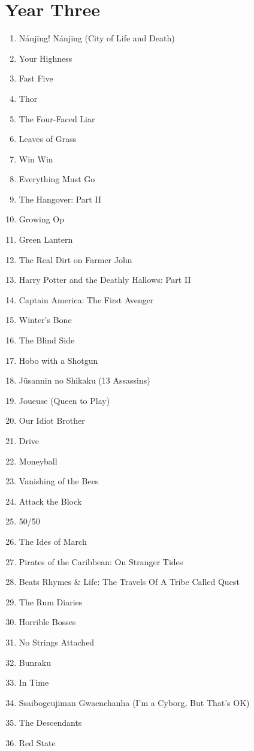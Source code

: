 \documentclass[11pt]{article}
\begin{document}
\section{Year Three}
\begin{enumerate}
\item Nánjīng! Nánjīng (City of Life and Death)
\item Your Highness
\item Fast Five
\item Thor
\item The Four-Faced Liar
\item Leaves of Grass
\item Win Win
\item Everything Must Go
\item The Hangover: Part II
\item Growing Op
\item Green Lantern 
\item The Real Dirt on Farmer John
\item Harry Potter and the Deathly Hallows: Part II
\item Captain America: The First Avenger 
\item Winter's Bone
\item The Blind Side
\item Hobo with a Shotgun
\item Jūsannin no Shikaku (13 Assassins)
\item Joueuse (Queen to Play)
\item Our Idiot Brother
\item Drive
\item Moneyball
\item Vanishing of the Bees
\item Attack the Block
\item 50/50
\item The Ides of March
\item Pirates of the Caribbean: On Stranger Tides
\item Beats Rhymes \& Life: The Travels Of A Tribe Called Quest
\item The Rum Diaries
\item Horrible Bosses
\item No Strings Attached
\item Bunraku
\item In Time
\item Ssaibogeujiman Gwaenchanha (I'm a Cyborg, But That's OK)
\item The Descendants
\item Red State

\end{enumerate}
\end{document}

